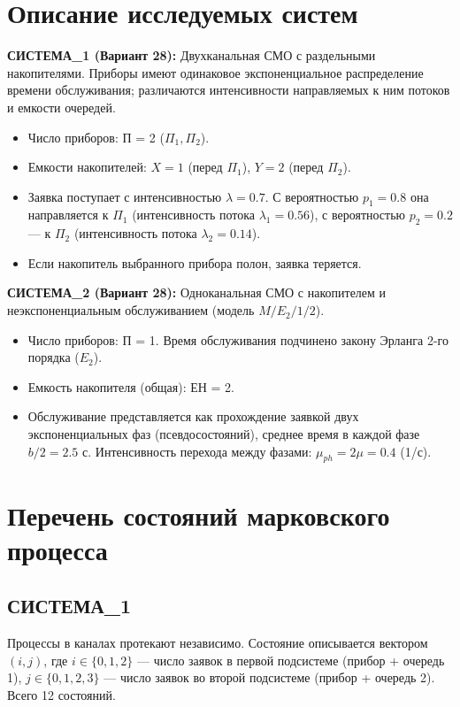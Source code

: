 \documentclass[a4paper,12pt]{article}
\begin{document}
    \section{Описание исследуемых систем}
    \textbf{СИСТЕМА\_1 (Вариант 28):}
    Двухканальная СМО с раздельными накопителями. Приборы имеют одинаковое экспоненциальное распределение времени обслуживания; различаются интенсивности направляемых к ним потоков и емкости очередей.
    \begin{itemize}
        \item Число приборов: П = 2 ($\Pi_1, \Pi_2$).
        \item Емкости накопителей: $X=1$ (перед $\Pi_1$), $Y=2$ (перед $\Pi_2$).
        \item Заявка поступает с интенсивностью $\lambda = 0.7$. С вероятностью $p_1=0.8$ она направляется к $\Pi_1$ (интенсивность потока $\lambda_1 = 0.56$), с вероятностью $p_2=0.2$ — к $\Pi_2$ (интенсивность потока $\lambda_2 = 0.14$).
        \item Если накопитель выбранного прибора полон, заявка теряется.
    \end{itemize}

    \textbf{СИСТЕМА\_2 (Вариант 28):}
    Одноканальная СМО с накопителем и неэкспоненциальным обслуживанием (модель $M/E_2/1/2$).
    \begin{itemize}
        \item Число приборов: П = 1. Время обслуживания подчинено закону Эрланга 2-го порядка ($E_2$).
        \item Емкость накопителя (общая): ЕН = 2.
        \item Обслуживание представляется как прохождение заявкой двух экспоненциальных фаз (псевдосостояний), среднее время в каждой фазе $b/2 = 2.5$ с. Интенсивность перехода между фазами: $\mu_{ph} = 2\mu = 0.4$ (1/с).
    \end{itemize}

    \section{Перечень состояний марковского процесса}

    \subsection{СИСТЕМА\_1}
    Процессы в каналах протекают независимо. Состояние описывается вектором $(i, j)$, где $i \in \{0, 1, 2\}$ — число заявок в первой подсистеме (прибор + очередь 1), $j \in \{0, 1, 2, 3\}$ — число заявок во второй подсистеме (прибор + очередь 2). Всего 12 состояний.
\end{document}
